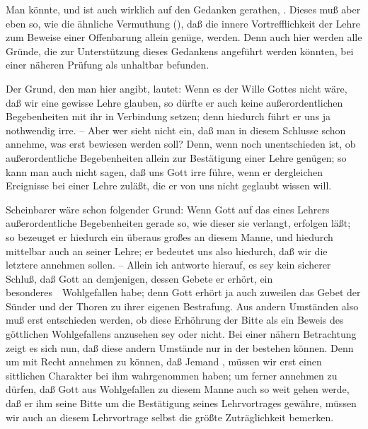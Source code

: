 Man könnte, und ist auch wirklich auf den Gedanken gerathen, . Dieses muß aber eben so, wie die ähnliche Vermuthung (), daß die innere Vortrefflichkeit der Lehre zum Beweise einer Offenbarung allein genüge,  werden. Denn auch hier werden alle Gründe, die zur Unterstützung dieses Gedankens angeführt werden könnten, bei einer näheren Prüfung als unhaltbar befunden.
\begin{aufza}
\item Der  Grund, den man hier angibt, lautet: Wenn es der Wille Gottes nicht wäre, daß wir eine gewisse Lehre glauben, so dürfte er auch keine außerordentlichen Begebenheiten mit ihr in Verbindung setzen; denn hiedurch führt er uns ja nothwendig irre. -- Aber wer sieht nicht ein, daß man in diesem Schlusse schon annehme, was erst bewiesen werden soll? Denn, wenn noch unentschieden ist, ob außerordentliche Begebenheiten allein zur Bestätigung einer Lehre genügen; so kann man auch nicht sagen, daß uns Gott irre führe, wenn er dergleichen Ereignisse bei einer Lehre zuläßt, die er von uns nicht geglaubt wissen will.
\item Scheinbarer wäre schon folgender Grund: Wenn Gott auf das  eines Lehrers außerordentliche Begebenheiten gerade so, wie dieser sie verlangt, erfolgen läßt; so bezeuget er hiedurch ein überaus großes  an diesem Manne, und hiedurch mittelbar auch an seiner Lehre; er bedeutet uns also hiedurch, daß wir die letztere annehmen sollen. -- Allein ich antworte hierauf, es sey kein sicherer Schluß, daß Gott an demjenigen, dessen Gebete er erhört, ein besonderes~\ Wohlgefallen habe; denn Gott erhört ja auch zuweilen das Gebet der Sünder und der Thoren zu ihrer eigenen Bestrafung. Aus andern Umständen also muß erst entschieden werden, ob diese Erhöhrung der Bitte als ein Beweis des göttlichen Wohlgefallens anzusehen sey oder nicht. Bei einer nähern Betrachtung zeigt es sich nun, daß diese andern Umstände nur in der  bestehen können. Denn um mit Recht annehmen zu können, daß Jemand , müssen wir erst einen sittlichen Charakter bei ihm wahrgenommen haben; um ferner annehmen zu dürfen, daß Gott aus Wohlgefallen zu diesem Manne auch so weit gehen werde, daß er ihm seine Bitte um die Bestätigung seines Lehrvortrages gewähre, müssen wir auch an diesem Lehrvortrage selbst die größte Zuträglichkeit bemerken.

\end{aufza}
